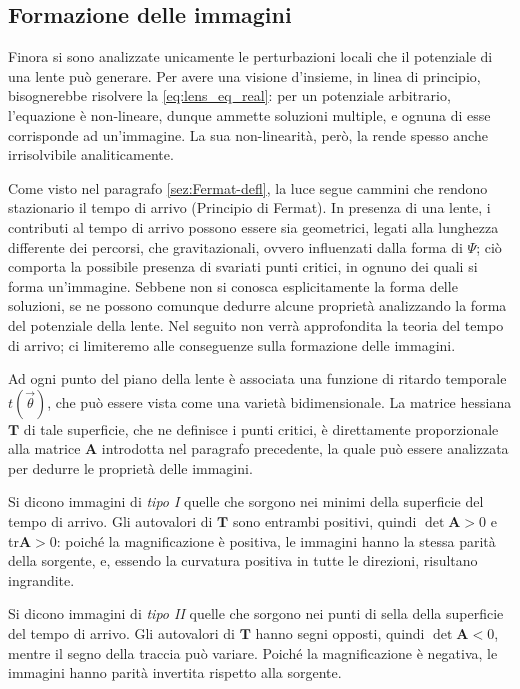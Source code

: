 \subsection{Formazione delle immagini}
\label{sez:Image formation}
Finora si sono analizzate unicamente le perturbazioni locali che il potenziale di una lente può generare. Per avere una visione d'insieme, in linea di principio, bisognerebbe risolvere la \ref{eq:lens_eq_real}: per un potenziale arbitrario, l'equazione è non-lineare, dunque ammette soluzioni multiple, e ognuna di esse corrisponde ad un'immagine.
La sua non-linearità, però, la rende spesso anche irrisolvibile analiticamente.

Come visto nel paragrafo \ref{sez:Fermat-defl}, la luce segue cammini che rendono stazionario il tempo di arrivo (Principio di Fermat). In presenza di una lente, i contributi al tempo di arrivo possono essere sia geometrici, legati alla lunghezza differente dei percorsi, che gravitazionali, ovvero influenzati dalla forma di $\Psi$; ciò comporta la possibile presenza di svariati punti critici, in ognuno dei quali si forma un'immagine.
Sebbene non si conosca esplicitamente la forma delle soluzioni, se ne possono comunque dedurre alcune proprietà analizzando la forma del potenziale della lente. Nel seguito non verrà approfondita la teoria del tempo di arrivo; ci limiteremo alle conseguenze sulla formazione delle immagini.

Ad ogni punto del piano della lente è associata una funzione di ritardo temporale $t(\vec\theta)$, che può essere vista come una varietà bidimensionale. La matrice hessiana $\mathbf{T}$ di tale superficie, che ne definisce i punti critici, è direttamente proporzionale alla matrice $\mathbf{A}$ introdotta nel paragrafo precedente, la quale può essere analizzata per dedurre le proprietà delle immagini.

Si dicono immagini di \emph{tipo I} quelle che sorgono nei minimi della superficie del tempo di arrivo. Gli autovalori di $\mathbf{T}$ sono entrambi positivi, quindi $\det \mathbf{A}>0$ e tr$\mathbf{A}>0$: poiché la magnificazione è positiva, le immagini hanno la stessa parità della sorgente, e, essendo la curvatura positiva in tutte le direzioni, risultano ingrandite.

Si dicono immagini di \emph{tipo II} quelle che sorgono nei punti di sella della superficie del tempo di arrivo. Gli autovalori di $\mathbf{T}$ hanno segni opposti, quindi $\det \mathbf{A}<0$, mentre il segno della traccia può variare. Poiché la magnificazione è negativa, le immagini hanno parità invertita rispetto alla sorgente.

